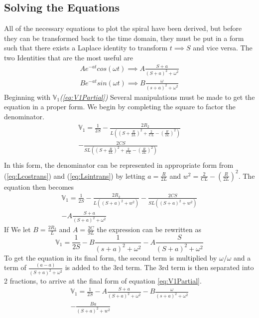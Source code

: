 \documentclass[conference]{IEEEtran}
\begin{document}
\subsection{Solving the Equations}
All of the necessary equations to plot the spiral have been derived, but before they can be transformed
back to the time domain, they must be put in a form such that there exists a Laplace identity to transform
$t\implies{S}$ and vice versa. The two Identities that are the most useful are
\begin{align} \label{eq:Lcostrans}
    Ae^{-at}cos(\omega{t}) \implies A\frac{S+a}{(S+a)^2 + \omega^2}\\
    \label{eq:Lsintrans}
    Be^{-at}sin(\omega{t}) \implies B\frac{\omega}{(s+a)^2 + \omega^2}
\end{align}
Beginning with ${\mathbb{V}}_1$\textit{(\ref{eq:V1Partial})} Several manipulations must be made to get the equation in a proper form. We begin by completing the square to factor the denominator.
\begin{multline*}
    {\mathbb{V}}_1 = \frac{1}{2S} - \frac{2R_2}{L((S + \frac{R}{2L})^2 + \frac{2}{CL}- (\frac{R}{2L})^2)}\\
    - \frac{2CS}{SL((S + \frac{R}{2L})^2 + \frac{2}{CL} - (\frac{R}{2L})^2)}\\
    {}
\end{multline*}
In this form, the denominator can be represented in appropriate form from (\ref{eq:Lcostrans}) and (\ref{eq:Lsintrans}) by letting $a = \frac{R}{2L}$ and $w^2 = \frac{2}{CL}- (\frac{R}{2L})^2$.
The equation then becomes
\begin{multline} \label{eq:SandOmega}
    {\mathbb{V}}_1 = \frac{1}{2S} - \frac{2R_2}{L((S+a)^2 + w^2)} - \frac{2CS}{SL((S+a)^2 + w^2)}\\
    - A\frac{S+a}{(S+a)^2 + \omega^2}
\end{multline}
If We let $B = \frac{2R_2}{L}$ and $A = \frac{2C}{SL}$ the expression can be rewritten as 
\begin{equation*}
    {\mathbb{V}}_1 = \frac{1}{2S} - B\frac{1}{(s+a)^2 + \omega^2} - A\frac{S}{(S+a)^2 + \omega^2}
\end{equation*}
To get the equation in its final form, the second term is multiplied by $\omega/\omega$ and a term of $\frac{(a - a)}{(S+a)^2 + \omega^2}$ is added to the 3rd term. The 3rd term is then separated into 2 fractions, to arrive at the final form of equation \ref{eq:V1Partial}.
\begin{multline}\label{eq:V1Final}
    {\mathbb{V}}_1 = \frac{1}{2S} - A\frac{S+a}{(S+a)^2 + \omega^2} - B\frac{\omega}{(s+a)^2 + \omega^2}\\
    - \frac{Ba}{(S+a)^2 + w^2}
\end{multline}
\end{document}
